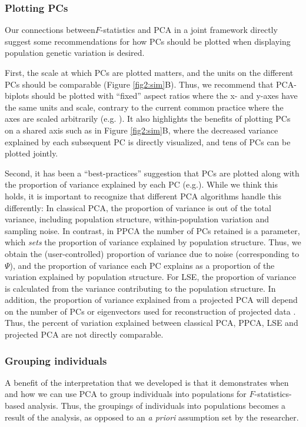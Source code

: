 \documentclass[12pt]{article}
\begin{document}
\subsubsection{Plotting PCs}
Our connections between$F$-statistics and PCA in a joint framework directly suggest some recommendations for how PCs should be plotted when displaying population genetic variation is desired. 

First, the scale at which PCs are plotted matters, and the units on the different PCs should be comparable (Figure \ref{fig2:sim}B). Thus, we recommend that PCA-biplots should be plotted with ``fixed'' aspect ratios where the x- and y-axes have the same units and scale, contrary to the current common practice where the axes are scaled arbitrarily (e.g. \cite{novembre_genes_2008, peter_genetic_2020}). It also highlights the benefits of plotting PCs on a shared axis such as in Figure \ref{fig2:sim}B, where the decreased variance explained by each subsequent PC is directly visualized, and tens of PCs can be plotted jointly.

Second, it has been a ``best-practices'' suggestion that PCs are plotted along with the proportion of variance explained by each PC (e.g.\citep{novembre_recent_2016, elhaik_principal_2022}). While we think this holds, it is important to recognize that different PCA algorithms handle this differently: In classical PCA, the proportion of variance is out of the total variance, including population structure, within-population variation and sampling noise. In contrast, in PPCA the number of PCs retained is a parameter, which \emph{sets} the proportion of variance explained by population structure. Thus, we obtain the (user-controlled) proportion of variance due to noise (corresponding to $\Psi$), and the proportion of variance each PC explains as a proportion of the variation explained by population structure. For LSE, the proportion of variance is calculated from the variance contributing to the population structure. In addition, the proportion of variance explained from a projected PCA will depend on the number of PCs or eigenvectors used for reconstruction of projected data \citep{patterson_population_2006}. 
Thus, the percent of variation explained between classical PCA, PPCA, LSE and projected PCA are not directly comparable.

\subsubsection{Grouping individuals}
A benefit of the interpretation that we developed is that it demonstrates when and how we can use PCA to group individuals into populations for $F$-statistics-based analysis. 
Thus, the groupings of individuals into populations becomes a result of the analysis, as opposed to an \textit{a priori} assumption set by the researcher.
\end{document}
